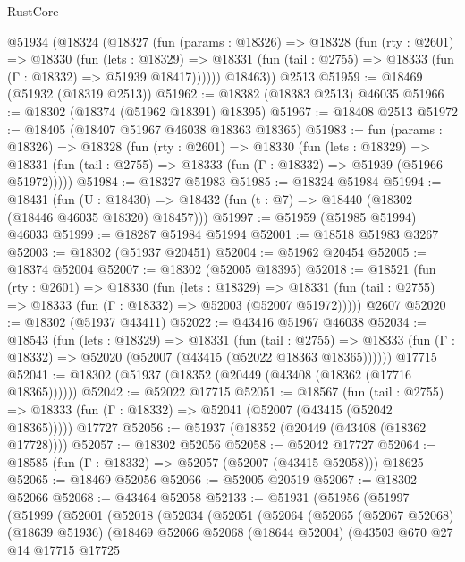 \begin{lexlean}{RustCore}
\begin{coremodule}
    @51934
      (@18324
        (@18327
          (fun (params : @18326) =>
          @18328
            (fun (rty : @2601) =>
            @18330
              (fun (lets : @18329) =>
              @18331 (fun (tail : @2755) => @18333 (fun (Γ : @18332) => @51939 @18417))))))
        @18463))
    @2513
@51959 := @18469 (@51932 (@18319 @2513))
@51962 := @18382 (@18383 @2513) @46035
@51966 := @18302 (@18374 (@51962 @18391) @18395)
@51967 := @18408 @2513
@51972 := @18405 (@18407 @51967 @46038 @18363 @18365)
@51983 := fun (params : @18326) =>
  @18328
    (fun (rty : @2601) =>
    @18330
      (fun (lets : @18329) =>
      @18331 (fun (tail : @2755) => @18333 (fun (Γ : @18332) => @51939 (@51966 @51972)))))
@51984 := @18327 @51983
@51985 := @18324 @51984
@51994 := @18431
    (fun (U : @18430) => @18432 (fun (t : @7) => @18440 (@18302 (@18446 @46035 @18320) @18457)))
@51997 := @51959 (@51985 @51994) @46033
@51999 := @18287 @51984 @51994
@52001 := @18518 @51983 @3267
@52003 := @18302 (@51937 @20451)
@52004 := @51962 @20454
@52005 := @18374 @52004
@52007 := @18302 (@52005 @18395)
@52018 := @18521
    (fun (rty : @2601) =>
    @18330
      (fun (lets : @18329) =>
      @18331 (fun (tail : @2755) => @18333 (fun (Γ : @18332) => @52003 (@52007 @51972)))))
    @2607
@52020 := @18302 (@51937 @43411)
@52022 := @43416 @51967 @46038
@52034 := @18543
    (fun (lets : @18329) =>
    @18331
      (fun (tail : @2755) =>
      @18333 (fun (Γ : @18332) => @52020 (@52007 (@43415 (@52022 @18363 @18365))))))
    @17715
@52041 := @18302 (@51937 (@18352 (@20449 (@43408 (@18362 (@17716 @18365))))))
@52042 := @52022 @17715
@52051 := @18567
    (fun (tail : @2755) => @18333 (fun (Γ : @18332) => @52041 (@52007 (@43415 (@52042 @18365)))))
    @17727
@52056 := @51937 (@18352 (@20449 (@43408 (@18362 @17728))))
@52057 := @18302 @52056
@52058 := @52042 @17727
@52064 := @18585 (fun (Γ : @18332) => @52057 (@52007 (@43415 @52058))) @18625
@52065 := @18469 @52056
@52066 := @52005 @20519
@52067 := @18302 @52066
@52068 := @43464 @52058
@52133 := @51931
    (@51956
      (@51997
        (@51999
          (@52001
            (@52018
              (@52034
                (@52051
                  (@52064
                    (@52065
                      (@52067 @52068)
                      (@18639 @51936)
                      (@18469
                        @52066
                        @52068
                        (@18644 @52004)
                        (@43503
                          @670
                          @27
                          @14
                          @17715
                          @17725

\end{coremodule}
\end{lexlean}
